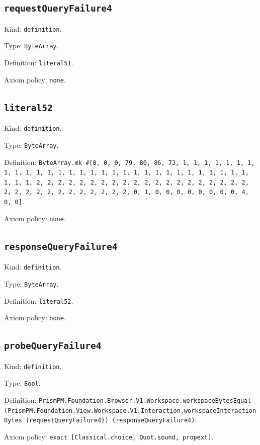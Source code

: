 \documentclass[11pt]{article}
\begin{document}
\subsection*{\texttt{requestQueryFailure4}}
\noindent Kind: \texttt{definition}.\par
\noindent Type: \texttt{ByteArray}.\par
\noindent Definition: \texttt{literal51}.\par
\noindent Axiom policy: \texttt{none}.\par
\subsection*{\texttt{literal52}}
\noindent Kind: \texttt{definition}.\par
\noindent Type: \texttt{ByteArray}.\par
\noindent Definition: \texttt{ByteArray.mk \#[0, 0, 0, 79, 80, 86, 73, 1, 1, 1, 1, 1, 1, 1, 1, 1, 1, 1, 1, 1, 1, 1, 1, 1, 1, 1, 1, 1, 1, 1, 1, 1, 1, 1, 1, 1, 1, 1, 1, 1, 2, 2, 2, 2, 2, 2, 2, 2, 2, 2, 2, 2, 2, 2, 2, 2, 2, 2, 2, 2, 2, 2, 2, 2, 2, 2, 2, 2, 2, 2, 2, 2, 0, 1, 0, 0, 0, 0, 0, 0, 0, 0, 4, 0, 0]}.\par
\noindent Axiom policy: \texttt{none}.\par
\subsection*{\texttt{responseQueryFailure4}}
\noindent Kind: \texttt{definition}.\par
\noindent Type: \texttt{ByteArray}.\par
\noindent Definition: \texttt{literal52}.\par
\noindent Axiom policy: \texttt{none}.\par
\subsection*{\texttt{probeQueryFailure4}}
\noindent Kind: \texttt{definition}.\par
\noindent Type: \texttt{Bool}.\par
\noindent Definition: \texttt{PrismPM.Foundation.Browser.V1.Workspace.workspaceBytesEqual (PrismPM.Foundation.View.Workspace.V1.Interaction.workspaceInteractionBytes (requestQueryFailure4)) (responseQueryFailure4)}.\par
\noindent Axiom policy: \texttt{exact [Classical.choice, Quot.sound, propext]}.\par
\end{document}
